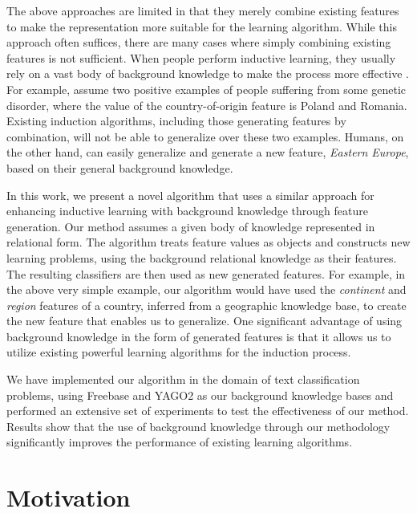 \documentclass{article}
\theoremstyle{definition}
\begin{document}
The above approaches are limited in that they merely combine existing features to make the representation more suitable for the 
learning algorithm.  While this approach often suffices, there are many cases where simply combining existing features is not sufficient.
When people perform inductive learning, they usually rely on a vast body of background knowledge to make the process more
effective \citep{mcnamara1996learning}. For example, assume two positive examples of people suffering from some genetic disorder, where the 
value of the country-of-origin feature is Poland and Romania.  Existing induction algorithms, including those generating features 
by combination, will not be able to generalize over these two examples.  Humans, on the other hand, can easily generalize 
and generate a new feature, \emph{Eastern Europe}, based
on their general background knowledge.

In this work, we present a novel algorithm that uses a similar approach for enhancing inductive learning with background knowledge through feature generation.
Our method assumes a given body of knowledge represented in relational form.  The algorithm treats feature values as objects and constructs new learning problems, using the background relational knowledge as their features.  The resulting classifiers are then used as new generated features.
For example, in the above very simple example, our algorithm would have used the \emph{continent} and \emph{region} features of a country,
inferred from a geographic knowledge base, to create the new feature that enables us to generalize.  One significant advantage of
using background knowledge in the form of generated features is that it allows us to utilize existing powerful learning algorithms for the induction process.

We have implemented our algorithm in the domain of text classification problems, using Freebase and YAGO2 as our background knowledge bases 
and performed an extensive set of experiments to test the effectiveness of our method.  Results show that the use of background knowledge through our methodology significantly improves the performance of existing learning algorithms.

\section{Motivation} \label{motivation}
\end{document}
